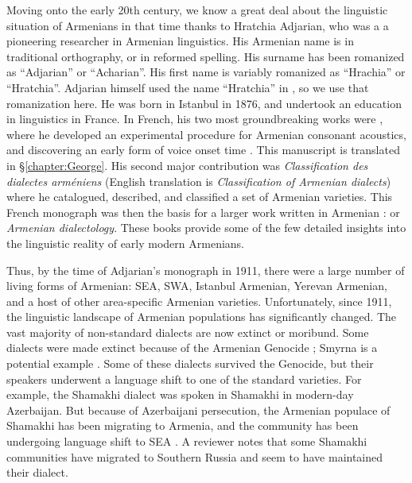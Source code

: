 \documentclass[output=paper]{langscibook}
\begin{document}
Moving onto the early 20th century, we know a great deal about the linguistic situation of Armenians in that time  thanks to Hratchia Adjarian, who was a a pioneering researcher in Armenian linguistics. His Armenian name is  in traditional orthography, or    in reformed spelling. His surname has been romanized as ``Adjarian'' or ``Acharian''. His first name is variably romanized as ``Hrachia'' or ``Hratchia''. Adjarian himself used the name ``Hratchia'' in \citep{Adjarian-1899-ArmenianExplosives}, so we use that romanization here. He was born in   Istanbul in 1876, and undertook an education in linguistics in France. In French, his two most groundbreaking works were \citet{Adjarian-1899-ArmenianExplosives}, where he developed an experimental procedure for Armenian consonant acoustics, and discovering an early form of voice onset time \citep{braun-2013-earlyCaseVOTAdjarian}.  This manuscript is translated in \S\ref{chapter:George}. His second major contribution was \citet{Adjarian-1909-ClassificationArmenianDialect} \textit{Classification des dialectes arméniens} (English translation is \textit{Classification of Armenian dialects}) where he catalogued, described, and classified a set of Armenian varieties. This French monograph was then the basis for a larger work written in Armenian \citep{Adjarian-1911-DialectologyBook}:   or  \textit{Armenian dialectology}. These books provide some of the few detailed insights into the linguistic reality of early modern Armenians.

Thus, by the time of Adjarian's monograph in 1911, there were a large number of living forms of Armenian: SEA, SWA, Istanbul Armenian, Yerevan Armenian, and a host of other area-specific Armenian varieties. Unfortunately, since 1911, the linguistic landscape of Armenian populations has significantly changed. The vast majority of non-standard dialects are now extinct or moribund. Some dialects were made extinct because of the Armenian Genocide \citep{Katvalyan-2015-GenocideArmenianLanguage}; Smyrna is a potential example \citep{Vaux-2012-ArmenianSmyrna}. Some of these dialects survived the Genocide, but their speakers underwent a language shift to one of the standard varieties. For example, the Shamakhi dialect was spoken in Shamakhi in modern-day Azerbaijan. But because of Azerbaijani persecution, the Armenian populace of Shamakhi has been migrating to Armenia, and the community has been undergoing language shift to SEA \citep{Vlasyan-2019-Shamakhi}. A reviewer notes that some Shamakhi communities have migrated to Southern Russia and seem to have maintained their dialect.   
\end{document}
